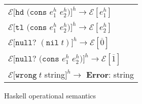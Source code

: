\begin{figure}[p]
\begin{tabular}{l}

$\mathscr{E}[\mathtt{hd}$ $(\mathtt{cons}$ $e^h_1$ $e^h_2)]^h\rightarrow\mathscr{E}[e^h_1]$ \\


$\mathscr{E}[\mathtt{tl}$ $(\mathtt{cons}$ $e^h_1$ $e^h_2)]^h\rightarrow\mathscr{E}[e^h_2]$ \\


$\mathscr{E}[\mathtt{null?}$ $(\mathtt{nil}\;t)]^h\rightarrow\mathscr{E}[\overline{0}]$ \\


$\mathscr{E}[\mathtt{null?}$ $(\mathtt{cons}$ $e^h_1$ $e^h_2)]^h\rightarrow\mathscr{E}[\overline{1}]$ \\


$\mathscr{E}[\mathtt{wrong}\;t$ string$]^h\rightarrow$ \textbf{Error}: string
\end{tabular}
\caption{Haskell operational semantics}
\label{hos}
\end{figure}